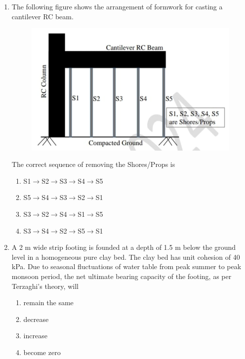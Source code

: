 \documentclass[journal,12pt,onecolumn]{article}
\theoremstyle{remark}
\begin{document}
\begin{enumerate}
    \item The following figure  shows the arrangement of formwork for casting a cantilever RC beam.
    \begin{figure}[H]
        \centering
        \includegraphics[width=0.7\columnwidth]{figs/1Q17.jpg}
        \caption{}
        \label{fig:q17}
    \end{figure}
    The correct sequence of removing the Shores/Props is

    \hfill{}
    \begin{enumerate}
        \item S1$\rightarrow$S2$\rightarrow$S3$\rightarrow$S4$\rightarrow$S5
        \item S5$\rightarrow$S4$\rightarrow$S3$\rightarrow$S2$\rightarrow$S1
        \item S3$\rightarrow$S2$\rightarrow$S4$\rightarrow$S1$\rightarrow$S5
        \item S3$\rightarrow$S4$\rightarrow$S2$\rightarrow$S5$\rightarrow$S1
    \end{enumerate}

    \item A 2 m wide strip footing is founded at a depth of 1.5 m below the ground level in a homogeneous pure clay bed. The clay bed has unit cohesion of 40 kPa. Due to seasonal fluctuations of water table from peak summer to peak monsoon period, the net ultimate bearing capacity of the footing, as per Terzaghi's theory, will
    
    \hfill{}
    \begin{enumerate}
        \item remain the same
        \item decrease
        \item increase
        \item become zero
    \end{enumerate}


\end{enumerate}
\end{document}

